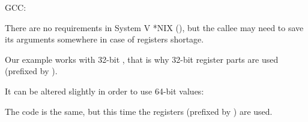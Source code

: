 \NonOptimizing GCC:




There are no  requirements in System V *NIX (\SysVABI), but the \gls{callee} may need to save
its arguments somewhere in case of registers shortage.



Our example works with 32-bit \Tint, that is why 32-bit register parts are used (prefixed by ).

It can be altered slightly in order to use 64-bit values:





The code is the same, but this time the  registers (prefixed by ) are used.

